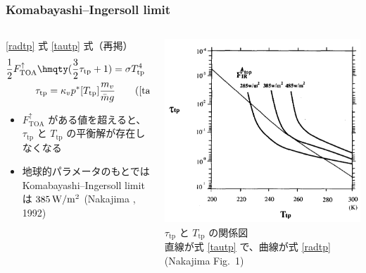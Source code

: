 \documentclass[aspectratio=149,9pt]{beamer}
\newcommand{\hmTOA}{\mathrm{TOA}}
\newcommand{\hmtp}{\mathrm{tp}}
\renewcommand{\qty}{\hmqty}
\begin{document}
\begin{frame}
	\frametitle{Komabayashi--Ingersoll limit}
	\begin{columns}
		\begin{column}{.55\textwidth}
			\begin{block}{\eqref{radtp} 式 \eqref{tautp} 式（再掲）}
				\begin{gather}
					\frac{1}{2}F^\uparrow_\hmTOA\qty(\frac{3}{2}\tau_\hmtp+1)=\sigma T^4_\hmtp\tag{\ref{radtp}}\\
					\tau_\hmtp=\kappa_vp^*[T_\hmtp]\frac{m_v}{\bar mg}\tag{\ref{tautp}}
				\end{gather}
			\end{block}
			\begin{itemize}
				\item \(F^\uparrow_\hmTOA\) がある値を超えると、\(\tau_\hmtp\) と
					\(T_\hmtp\) の平衡解が存在しなくなる
				\item 地球的パラメータのもとでは Komabayashi--Ingersoll limit は
					\(385\hmu{W/m^2}\) (Nakajima \etal*, 1992)
			\end{itemize}
		\end{column}
		\begin{column}{.45\textwidth}
			\centering
			\includegraphics[width=\textwidth]{nakajima1.png}\\
			\scriptsize
			\(\tau_\hmtp\) と \(T_\hmtp\) の関係図\\
			直線が式 \eqref{tautp} で、曲線が式 \eqref{radtp}\\
			(Nakajima \etal Fig.~1)
		\end{column}
	\end{columns}
\end{frame}
\end{document}
